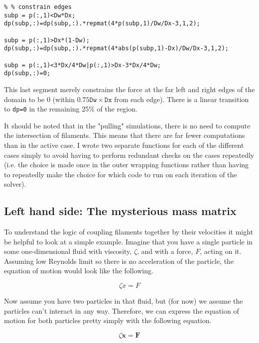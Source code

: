 \begin{verbatim}
% % constrain edges
subp = p(:,1)<Dw*Dx;
dp(subp,:)=dp(subp,:).*repmat(4*p(subp,1)/Dw/Dx-3,1,2);

subp = p(:,1)>Dx*(1-Dw);
dp(subp,:)=dp(subp,:).*repmat(4*abs(p(subp,1)-Dx)/Dw/Dx-3,1,2);

subp = p(:,1)<3*Dx/4*Dw|p(:,1)>Dx-3*Dx/4*Dw;
dp(subp,:)=0;
\end{verbatim}

This last segment merely constrains the force at the far left and right edges of the domain to be 0 (within $0.75 \texttt{Dw}\times\texttt{Dx}$ from each edge).  There is a linear transition to \texttt{dp=0} in the remaining 25\% of the region.

It should be noted that in the "pulling" simulations, there is no need to compute the intersection of filaments.  This means that there are far fewer computations than in the active case.   I wrote two separate functions for each of the different cases simply to avoid having to perform redundant checks on the cases repeatedly (i.e. the choice is made once in the outer wrapping functions rather than having to repeatedly make the choice for which code to run on each iteration of the solver).

\subsection{Left hand side: The mysterious mass matrix}

To understand the logic of coupling filaments together by their velocities it might be helpful to look at a simple example.  Imagine that you have a single particle in some one-dimensional fluid with viscosity, $\zeta$, and with a force, $F$, acting on it.  Assuming low Reynolds limit so there is no acceleration of the particle, the equation of motion would look like the following.

\begin{equation}
\zeta\dot{x}=F
\end{equation}

Now assume you have two particles in that fluid, but (for now) we assume the particles can't interact in any way.  Therefore, we can express the equation of motion for both particles pretty simply with the following equation.

\begin{equation}
\zeta\mathbf{\dot{x}}=\mathbf{F}
\end{equation}

